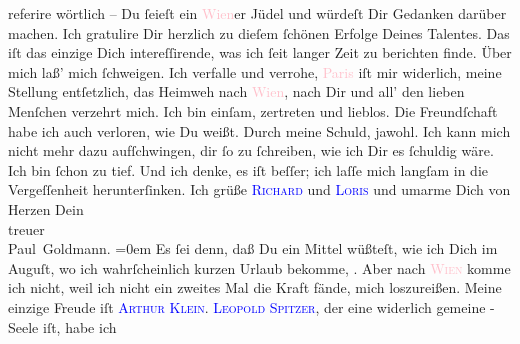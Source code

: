                referire wörtlich – Du ſeieſt ein \textcolor{pink}{Wien}{}\ledrightnote{\textcolor{pink}{Wien}}er Jüdel und
               würdeſt Dir \label{K_L02698-3v}\label{K_L02698-3h} Gedanken darüber machen.\pend
           \pstart
           Ich gratulire Dir herzlich zu dieſem ſchönen Erfolge Deines Talentes.\pend
           \pstart
           Das iſt das einzige Dich intereſſirende, was ich ſeit langer Zeit zu berichten
               finde.\pend
           \pstart
           Über mich laß’ mich ſchweigen. Ich verfalle und verrohe, \textcolor{pink}{Paris}{}\ledrightnote{\textcolor{pink}{Paris}} iſt mir widerlich, meine Stellung entſetzlich, das
               Heimweh nach \textcolor{pink}{Wien}{}\ledrightnote{\textcolor{pink}{Wien}}, nach Dir und all’ {\pb}den lieben Menſchen verzehrt mich. Ich bin einſam,
               zertreten und lieblos. Die Freundſchaft habe ich auch verloren, wie Du weißt. Durch
               meine Schuld, jawohl. Ich kann mich nicht mehr dazu aufſchwingen, dir ſo zu
               ſchreiben, wie ich Dir es ſchuldig wäre. Ich bin ſchon zu tief. Und ich denke, es iſt
               beſſer; ich laſſe mich langſam in die Vergeſſenheit herunterſinken.\pend
           \pstart
           Ich grüße \textsc{\textcolor{blue}{Richard}{}\ledrightnote{\textcolor{blue}{Richard Beer-Hofmann}}} und \textcolor{blue}{\textsc{Loris}}{}\ledrightnote{\textcolor{blue}{Hugo von Hofmannsthal}} und
               umarme Dich von Herzen\pend
           \pstart
           Dein {\\[\baselineskip]}treuer {\\[\baselineskip]}\spacefill\mbox{Paul Goldmann.}\pend
           \leftskip=0em{}\pstart
           \noindent{}{\pb}Es ſei denn, daß Du ein Mittel wüßteſt, wie ich
                  Dich im Auguſt, wo ich wahrſcheinlich kurzen Urlaub
                  bekomme, \label{K_L02698-4v}\label{K_L02698-4h}. Aber nach \textsc{\textcolor{pink}{Wien}{}\ledrightnote{\textcolor{pink}{Wien}}} komme ich nicht, weil ich nicht ein zweites Mal die Kraft fände, mich
                  loszureißen.\pend
           \pstart
           Meine einzige Freude iſt \textsc{\textcolor{blue}{Arthur Klein}{}\ledrightnote{\textcolor{blue}{Arthur Klein}}}. \textsc{\textcolor{blue}{Leopold Spitzer}{}\ledrightnote{\textcolor{blue}{Leopold Spitzer}}}, der eine widerlich gemeine \label{K_L02698-5v}\label{K_L02698-5h}-Seele iſt, habe ich

